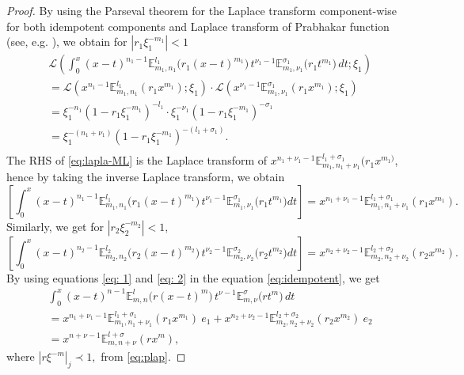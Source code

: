 \documentclass[a4paper,12pt]{article}
\theoremstyle{remark}
\begin{document}
\begin{proof}
 By using the Parseval theorem for the Laplace transform component-wise for both  idempotent components \cite{titchmarsh1937introduction,kilbas2004generalized} and Laplace transform of  Prabhakar function (see, e.g. \cite{gorenflo2014,kilbas2006}), we obtain for $|r_1 \xi_1^{-m_1}| < 1$		\begin{equation}\label{eq:lapla-ML}
		\begin{split}
		&	\mathcal{L}	\left(  \int_0^x (x - t)^{n_1 - 1} \mathbb{E}_{m_1,n_1}^{l_1}\big(r_1(x - t)^{m_1}\big) \, t^{\nu_1 - 1} \mathbb{E}_{m_1,\nu_1}^{\sigma_1}\big(r_1 t^{m_1}\big) \, dt;\xi_1\right)  \\
		&=\mathcal{L} \left( x^{n_1 - 1} \mathbb{E}^{l_1}_{m_1,n_1}(r_1 x^{m_1});\xi_1 \right) \cdot \mathcal{L} \left( x^{\nu_1 - 1} \mathbb{E}^{\sigma_1}_{m_1,\nu_1}(r_1 x^{m_1});\xi_1 \right)\\
		&=\xi_1^{-n_1} \left(1 - r_1 \xi_1^{-m_1} \right)^{-l_1} \cdot \xi_1^{-\nu_1} \left(1 - r_1 \xi_1^{-m_1} \right)^{-\sigma_1}\\
	&	= \xi_1^{-(n_1 + \nu_1)} \left(1 - r_1 \xi_1^{-m_1} \right)^{-(l_1 + \sigma_1)}.\\
		\end{split}
		\end{equation}			
\noindent The RHS of \eqref{eq:lapla-ML} is the Laplace transform of \( x^{n_1 + \nu_1 - 1} \mathbb{E}^{l_1 + \sigma_1}_{m_1, n_1 + \nu_1} (r_1 x^{m_1)} \), hence by taking the inverse Laplace transform, we obtain 
	\begin{equation}\label{eq: 1}
		\left[ \int_0^x (x - t)^{n_1 - 1} \mathbb{E}_{m_1,n_1}^{l_1}\big(r_1(x - t)^{m_1}\big) \, t^{\nu_1 - 1} \mathbb{E}_{m_1,\nu_1}^{\sigma_1}\big(r_1 t^{m_1}\big)  dt\right] =  x^{n_1 + \nu_1 - 1} \mathbb{E}^{l_1 + \sigma_1}_{m_1, n_1 + \nu_1} (r_1 x^{m_1}).
	\end{equation}
   	Similarly, we get for $|r_2 \xi_2^{-m_2}| < 1,$	
\begin{equation}\label{eq: 2}
	\left[ \int_0^x (x - t)^{n_2 - 1} \mathbb{E}_{m_2,n_2}^{l_2}\big(r_2(x - t)^{m_2}\big) \, t^{\nu_2 - 1} \mathbb{E}_{m_2,\nu_2}^{\sigma_2}\big(r_2 t^{m_2}\big)  dt\right] =  x^{n_2 + \nu_2 - 1} \mathbb{E}^{l_2 + \sigma_2}_{m_2, n_2 + \nu_2} (r_2 x^{m_2}).
	\end{equation}
	By using equations \eqref{eq: 1} and \eqref{eq: 2} in the equation \eqref{eq:idempotent}, we get
		\begin{equation}
	\begin{split}
	&	\int_0^x (x - t)^{n - 1} \mathbb{E}_{m,n}^{l}\big(r(x - t)^{m}\big) \, t^{\nu - 1} \mathbb{E}_{m,\nu}^{\sigma}\big(r t^{m}\big) \, dt \\
	&=x^{n_1 + \nu_1 - 1} \mathbb{E}^{l_1 + \sigma_1}_{m_1, n_1 + \nu_1} (r_1 x^{m_1})~ e_1+ x^{n_2 + \nu_2 - 1} \mathbb{E}^{l_2 + \sigma_2}_{m_2, n_2 + \nu_2} (r_2 x^{m_2})~e_2\\
	&= x^{n + \nu - 1} \mathbb{E}^{l + \sigma}_{m, n + \nu} (r x^{m}),
	\end{split}
	\end{equation}
where $|r \xi^{-m}|_j\prec1,  $  from \eqref{eq:plap}.
\end{proof}
\end{document}
